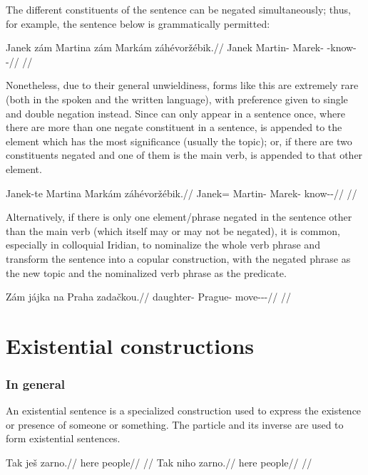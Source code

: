 The different constituents of the sentence can be negated simultaneously; thus,
for example, the sentence below is grammatically permitted:

\pex
\begingl
     Janek {zám} Martina {zám} Markám {zá}hévoržébik.//
    \glb \Neg{} Janek \Neg{} Martin-\Acc{} \Neg{} Marek-\Agt{} \Neg{}-know-\Ben{}-\Pf{}//
    \glft {}//
\endgl
\xe

Nonetheless, due to their general unwieldiness, forms like this are extremely
rare (both in the spoken and the written language), with preference given to
single and double negation instead. Since  can only appear in a
sentence once, where there are more than one negate constituent in a sentence,
 is appended to the element which has the most significance (usually
the topic); or, if there are two constituents negated and one of them is the
main verb,  is appended to that other element.

\pex
\begingl
     Janek{-te} Martina Markám {zá}hévoržébik.//
    \glb \Neg{} Janek=\Foc{} Martin-\Acc{} Marek-\Agt{} \Neg{}know-\Ben{}-\Pf{}//
    \glft {}//
\endgl
\xe

Alternatively, if there is only one element/phrase negated in the sentence other
than the main verb (which itself may or may not be negated), it is common,
especially in colloquial Iridian, to
nominalize the whole verb phrase and transform the
sentence into a copular construction, with the
negated phrase as the new topic and the nominalized verb phrase as
the predicate.

\pex
\begingl
    \gla Zám jájka na Praha zadačkou.//
    \glb \Neg{} daughter-\Dim{} \Loc{} Prague-\Acc{} move-\Av{}-\Pf{}-\Nz{}//
    \glft {}//
\endgl
\xe




\section{Existential constructions}
\label{sec:exst}

\subsubsection{In general}
An existential sentence is a specialized construction used to express the
existence or presence of someone or something. The particle  and its
inverse  are used to form existential sentences. 
\begin{multicols}{2}
\pex
\a\begingl
\gla Tak ješ zarno.//
\glb here \Exst{} people//
\glft {}//
\endgl
\a\begingl
\gla Tak niho zarno.//
\glb here \N{}\Exst{} people//
\glft {}//
\endgl
\xe
\end{multicols}

